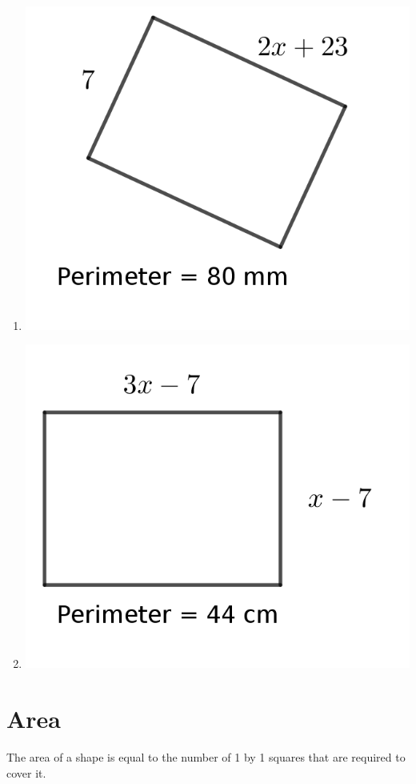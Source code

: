 \begin{multicols}{2}
\begin{enumerate}
	\item \includegraphics{./Images/Measurement/perAlg5.png}
	\item \includegraphics{./Images/Measurement/perAlg6.png}
\end{enumerate}
\end{multicols}
\section{Area}
The area of a shape is equal to the number of 1 by 1 squares that are required to cover it.


